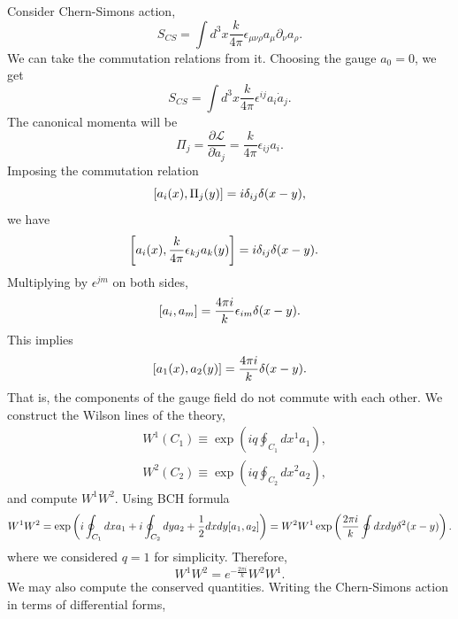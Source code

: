\documentclass{article}
\newcommand{\pd}[2]{\frac{\partial #1}{\partial #2}}
\renewcommand{\L}{\mathcal{L}}
\begin{document}
Consider Chern-Simons action, 
\begin{equation*}
	S_{CS}=\int d^3x \frac{k}{4\pi}\epsilon_{\mu\nu\rho}a_\mu\partial_\nu a_\rho.
\end{equation*}
We can take the commutation relations from it. Choosing the gauge $a_0=0$, we get 
\begin{equation}
	S_{CS}=\int d^3x\frac{k}{4\pi}\epsilon^{ij}a_i \dot{a}_j.
\end{equation}
The canonical momenta will be 
\begin{equation}
	\Pi_j=\pd{\L}{\dot{a}_j}=\frac{k}{4\pi}\epsilon_{ij}a_i.
\end{equation}
Imposing the commutation relation 
\begin{equation}
	\comm{a_i(x)}{\Pi_j(y)}=i\delta_{ij}\delta(x-y), 
\end{equation}
we have
\begin{equation}
	\begin{split}
		&\comm{a_i(x)}{\frac{k}{4\pi}\epsilon_{kj}a_k(y)}=i\delta_{ij}\delta(x-y).
	\end{split}
\end{equation}
Multiplying by $\epsilon^{jm}$ on both sides, 
\begin{equation}
	\comm{a_i}{a_m}=\frac{4\pi i}{k}\epsilon_{im}\delta(x-y). 
\end{equation}
This implies 
\begin{equation}
	\comm{a_1(x)}{a_2(y)}=\frac{4\pi i}{k}\delta(x-y).
\end{equation}
That is, the components of the gauge field do not commute with each other. We construct the Wilson lines of the theory, 
\begin{align}
	&W^1(C_1)\equiv\exp\left(iq\oint_{C_1}dx^1 a_1\right),\\
	&W^2(C_2)\equiv\exp\left(iq\oint_{C_2}dx^2 a_2\right),
\end{align}
and compute $W^1W^2$. Using BCH formula 
\begin{equation}
	W^1W^2=\exp\left(i\oint_{C_1}dx a_1+i\oint_{C_2}dy a_2+\frac{1}{2}dxdy\comm{a_1}{a_2}\right)=W^2W^1\exp\left(\frac{2\pi i}{k}\oint dxdy\delta^2(x-y)\right).
\end{equation}
where we considered $q=1$ for simplicity. Therefore, 
\begin{equation}\label{wilson lines commutation}
	W^1W^2=e^{-\frac{2\pi i}{k}}W^2W^1.
\end{equation}
We may also compute the conserved quantities. Writing the Chern-Simons action in terms of differential forms,
\end{document}
